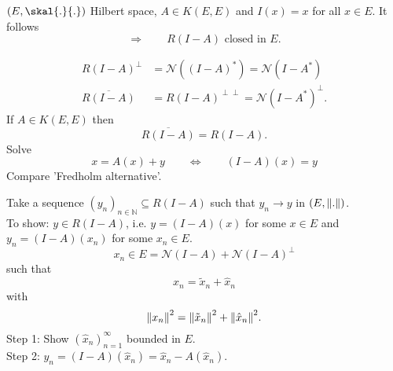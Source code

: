 \begin{beispiel}
	$(E,\skal{.}{.})$ Hilbert space, $A \in K(E,E)$ and $I(x)=x$ for all $x \in E$. It follows
	\[
		\Rightarrow  \qquad R(I-A) \text{ closed in $E$}.
	\]
\begin{bemerkung}
	\begin{align*}
		R(I-A)^{\perp} &= \mathcal{N}((I-A)^{*}) = \mathcal{N}(I-A^{*}) \\
		\overline{R(I-A)} &= R(I-A)^{\perp \perp} = \mathcal{N}(I-A^{*})^{\perp}.
	\end{align*}
	If $A \in K(E,E)$ then
	\[
		\overline{R(I-A)} = R(I-A).
	\]
	Solve \[
		x = A(x) + y \qquad \Leftrightarrow \qquad (I-A)(x) = y
	\]
	Compare 'Fredholm alternative'.
\end{bemerkung}
\end{beispiel}
\begin{beweis}
	Take a sequence $(y_n)_{n \in \mathbb{N}} \subseteq R(I-A)$ such that $y_n \to y$ in $(E,\norm{.})$. \\
	To show: $y \in R(I-A)$, i.e. $y = (I-A)(x)$ for some $x \in E$ and $y_n = (I-A)(x_n)$ for some $x_n \in E$.
	\[
		x_n \in E = \mathcal{N}(I-A) + \mathcal{N}(I-A)^{\perp}
	\]
	such that
	\[
		x_n = \tilde x_n + \hat x_n 
	\]
	with
	\[
		\norm{x_n}^2 = \norm{\tilde x_n}^2 + \norm{\hat x_n}^2.
	\]
	Step 1: Show $(\hat x_n)_{n=1}^{\infty}$ bounded in $E$. \\
	Step 2: $y_n = (I-A)( \hat x_n) = \hat x_n - A( \hat x_n)$. \\
\end{beweis}